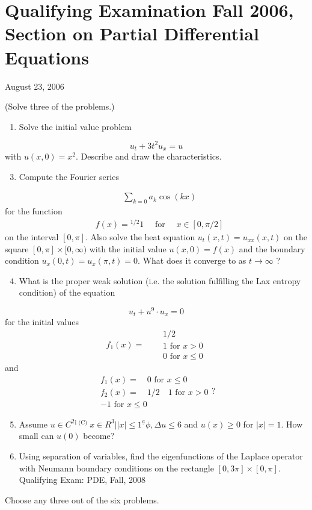 \documentclass[10pt]{article}
\begin{document}
\section*{Qualifying Examination Fall 2006, Section on Partial Differential Equations }
August 23, 2006

(Solve three of the problems.)

\begin{enumerate}
  \item Solve the initial value problem
\end{enumerate}
$$
u_{t}+3 t^{2} u_{x}=u
$$
with $u(x, 0)=x^{2}$. Describe and draw the characteristics.

\begin{enumerate}
  \setcounter{enumi}{2}
  \item Compute the Fourier series
\end{enumerate}
$$
\begin{aligned}
& \sum_{k=0} a_{k} \cos (k x)
\end{aligned}
$$
for the function
$$
\begin{aligned}
& f(x)={ }^{1 / 2} 1 \quad \text { for } \quad x \in[0, \pi / 2]
\end{aligned}
$$
on the interval $[0, \pi]$. Also solve the heat equation $u_{t}(x, t)=u_{x x}(x, t)$ on the square $[0, \pi] \times[0, \infty)$ with the initial value $u(x, 0)=f(x)$ and the boundary condition $u_{x}(0, t)=u_{x}(\pi, t)=0$. What does it converge to as $t \rightarrow \infty$ ?

\begin{enumerate}
  \setcounter{enumi}{3}
  \item What is the proper weak solution (i.e. the solution fulfilling the Lax entropy condition) of the equation
\end{enumerate}
$$
u_{t}+u^{9} \cdot u_{x}=0
$$
for the initial values
$$
f_{1}(x)=\quad \begin{aligned}
&1 / 2 \\
&1 \text { for } x>0 \\
&0 \text { for } x \leq 0
\end{aligned}
$$
and
$$
\begin{gathered}
f_{1}(x)=\quad 0 \text { for } x \leq 0 \\
f_{2}(x)=\quad 1 / 2 \quad 1 \text { for } x>0 \\
-1 \text { for } x \leq 0
\end{gathered} ?
$$

\begin{enumerate}
  \setcounter{enumi}{4}
  \item Assume $u \in C^{2}{ }^{\mathrm{i} \text { (C) }} x \in R^{3}|| x \mid \leq 1^{\underline{a}} \phi, \Delta u \leq 6$ and $u(x) \geq 0$ for $|x|=1$. How small can $u(0)$ become?

  \item Using separation of variables, find the eigenfunctions of the Laplace operator with Neumann boundary conditions on the rectangle $[0,3 \pi] \times[0, \pi]$. Qualifying Exam: PDE, Fall, 2008

\end{enumerate}
Choose any three out of the six problems.
\end{document}
